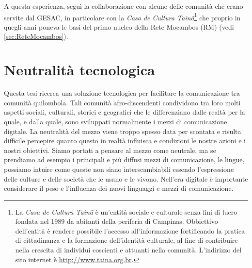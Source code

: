 A questa esperienza, seguì la collaborazione con alcune delle comunità
che erano servite dal GESAC, in particolare con la \emph{Casa de
  Cultura Tainã}\footnote{La \emph{Casa de Cultura Tainã} è un'entità
  sociale e culturale senza fini di lucro fondata nel 1989 da abitanti
  della periferia di Campinas. Obbiettivo dell'entità è rendere
  possibile l'accesso all'informazione fortificando la pratica di
  cittadinanza e la formazione dell'identità culturale, al fine di
  contribuire nella crescita di individui coscienti e attuanti nella
  comunità. L'indirizzo del sito internet è
  \url{http://www.taina.org.br}.} che proprio in quegli anni poneva le
basi del primo nucleo della Rete Mocambos (RM) (vedi
\ref{sec:ReteMocambos}). 

\section{Neutralità tecnologica}
Questa tesi ricerca una soluzione tecnologica per facilitare la
comunicazione tra comunità quilombola. Tali comunità
afro-discendenti condividono tra loro molti aspetti sociali,
culturali, storici e geografici che le differenziano dalle realtà per
la quale, e dalla quale, sono sviluppati normalmente i mezzi di
comunicazione digitale. La neutralità del mezzo viene troppo spesso
data per scontata e risulta difficile percepire quanto questo in
realtà influisca e condizioni le nostre azioni e i nostri
obiettivi. Siamo portati a pensare al mezzo come neutrale, ma se
prendiamo ad esempio i principali e più diffusi mezzi di
comunicazione, le lingue, possiamo intuire come queste non siano
interscambiabili essendo l'espressione delle culture e delle società
che le usano e le vivono. Nell'era digitale è importante considerare
il peso e l'influenza dei nuovi linguaggi e mezzi di comunicazione.

